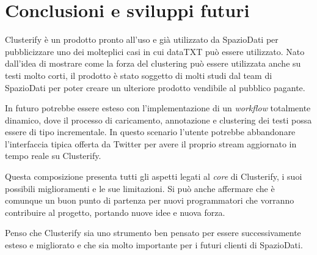 \chapter{Conclusioni e sviluppi futuri}
	Clusterify è un prodotto pronto all'uso e già utilizzato da SpazioDati per pubblicizzare uno dei molteplici casi in cui dataTXT può essere utilizzato. Nato dall'idea di mostrare come la forza del clustering può essere utilizzata anche su testi molto corti, il prodotto è stato soggetto di molti studi dal team di SpazioDati per poter creare un ulteriore prodotto vendibile al pubblico pagante.

	In futuro potrebbe essere esteso con l'implementazione di un \emph{workflow} totalmente dinamico, dove il processo di caricamento, annotazione e clustering dei testi possa essere di tipo incrementale. In questo scenario l'utente potrebbe abbandonare l'interfaccia tipica offerta da Twitter per avere il proprio stream aggiornato in tempo reale su Clusterify.

	Questa composizione presenta tutti gli aspetti legati al \emph{core} di Clusterify, i suoi possibili miglioramenti e le sue limitazioni. Si può anche affermare che è comunque un buon punto di partenza per nuovi programmatori che vorranno contribuire al progetto, portando nuove idee e nuova forza.

	Penso che Clusterify sia uno strumento ben pensato per essere successivamente esteso e migliorato e che sia molto importante per i futuri clienti di SpazioDati.